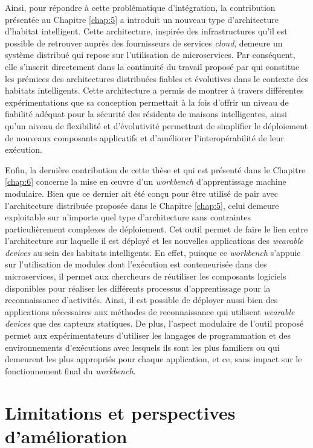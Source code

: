 Ainsi, pour répondre à cette problématique d'intégration, la contribution présentée au Chapitre \ref{chap:5} a introduit un nouveau type d'architecture d'habitat intelligent. Cette architecture, inspirée des infrastructures qu'il est possible de retrouver auprès des fournisseurs de services \textit{cloud}, demeure un système distribué qui repose sur l'utilisation de microservices. Par conséquent,  elle s'inscrit directement dans la continuité du travail proposé par \cite{Plantevin2018} qui constitue les prémices des architectures distribuées fiables et évolutives dans le contexte des habitats intelligents. Cette architecture a permis de montrer à travers différentes expérimentations que sa conception permettait à la fois d'offrir un niveau de fiabilité adéquat pour la sécurité des résidents de maisons intelligentes, ainsi qu'un niveau de flexibilité et d'évolutivité permettant de simplifier le déploiement de nouveaux composants applicatifs et d'améliorer l'interopérabilité de leur exécution.

Enfin, la dernière contribution de cette thèse et qui est présenté dans le Chapitre \ref{chap:6} concerne la mise en \oe{}uvre d'un \textit{workbench} d'apprentissage machine modulaire. Bien que ce dernier ait été conçu pour être utilisé de pair avec l'architecture distribuée proposée dans le Chapitre \ref{chap:5}, celui demeure exploitable sur n'importe quel type d'architecture sans contraintes particulièrement complexes de déploiement. Cet outil permet de faire le lien entre l'architecture sur laquelle il est déployé et les nouvelles applications des \textit{wearable devices} au sein des habitats intelligents. En effet, puisque ce \textit{workbench} s'appuie sur l'utilisation de modules dont l'exécution est conteneurisée dans des microservices, il permet aux chercheurs de réutiliser les composants logiciels disponibles pour réaliser les différents processus d'apprentissage pour la reconnaissance d'activités. Ainsi, il est possible de déployer aussi bien des applications nécessaires aux méthodes de reconnaissance qui utilisent \textit{wearable devices} que des capteurs statiques. De plus, l'aspect modulaire de l'outil proposé permet aux expérimentateurs d'utiliser les langages de programmation et des environnements d'exécutions avec lesquels ils sont les plus familiers ou qui demeurent les plus appropriés pour chaque application, et ce, sans impact sur le fonctionnement final du \textit{workbench}.

\section{Limitations et perspectives d'amélioration}

